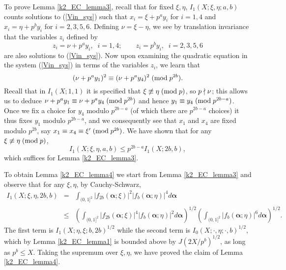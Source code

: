 \documentclass[brochure,english,12pt]{bourbaki}%
\newcommand{\albf}{\boldsymbol\alpha}
\begin{document}
To prove Lemma \ref{k2_EC_lemma3}, recall that for fixed $\xi,\eta$, 
$I_1(X;\xi,\eta;a,b)$ counts solutions to (\ref{Vin_sys}) such that 
$x_i = \xi + p^a y_i$ for $i=1,4$ and $x_i = \eta + p^b y_i$ for $i=2,3,5,6$.
Defining $\nu = \xi - \eta$, we see by translation invariance that the variables $z_i$ defined by 
\[ z_i = \nu + p^a y_i, \;\; i=1,4; \qquad z_i = p^by_i, \;\; i = 2,3,5,6 \]
are also solutions to (\ref{Vin_sys}). 
Now upon examining the quadratic equation in the system (\ref{Vin_sys}) in terms of the variables $z_i$, we learn that
\[ (\nu+p^ay_1)^2 \equiv (\nu + p^a y_4)^2 \; ( \text{mod} \; p^{2b}).\]
Recall that in $I_1(X;1,1)$ it is specified that $\xi \not\equiv \eta \; ( \text{mod} \; p)$, so $p \nmid \nu$; this allows us to deduce 
$\nu+p^ay_1 \equiv \nu + p^a y_4 \; ( \text{mod} \; p^{2b})$ and hence $y_1 \equiv y_4 \; ( \text{mod} \; p^{2b-a})$.
Once we fix a choice for $y_4$ modulo $p^{2b-a}$ (of which there are $p^{2b-a}$ choices) it thus fixes $y_1$ modulo $p^{2b-a}$, and we consequently see that $x_1$ and $x_4$ are fixed modulo $p^{2b}$, say $x_1 \equiv x_4 \equiv \xi' \; ( \text{mod} \; p^{2b})$.
We have shown that for any $\xi \not\equiv \eta \; ( \text{mod} \; p)$, 
\[ I_1(X;\xi,\eta,a,b) \leq p^{2b-a}I_1(X;2b,b),\]
which suffices for Lemma \ref{k2_EC_lemma3}.

To obtain Lemma \ref{k2_EC_lemma4} we start from Lemma \ref{k2_EC_lemma3} and observe that for any $\xi,\eta$, by Cauchy-Schwarz,
\begin{eqnarray*}
 I_1(X;\xi,\eta,2b,b) 
 	&=& \int_{(0,1]^2} |f_{2b}(\albf;\xi)|^2|f_b(\albf;\eta)|^4 d\albf \\
	& \leq & ( \int_{(0,1]^2} |f_{2b}(\albf;\xi)|^4|f_b(\albf;\eta)|^2 d\albf )^{1/2}( \int_{(0,1]^2} |f_b(\albf;\eta)|^6 d\albf )^{1/2}.
	 \end{eqnarray*}
The first term is $I_1(X;\eta,\xi;b,2b)^{1/2}$ while the second term is $I_0(X;\cdot, \eta;\cdot,b)^{1/2}$, which by Lemma \ref{k2_EC_lemma1} is bounded above by $J(2X/p^b)^{1/2}$, as long as $p^b \leq X$. Taking the supremum over $\xi,\eta$, we have proved the claim of Lemma \ref{k2_EC_lemma4}.
\end{document}
